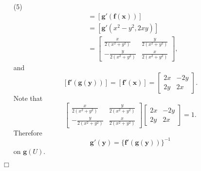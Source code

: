 \documentclass{article}
\begin{document}
\begin{enumerate}
\item[(5)]
  \begin{align*}
    [\mathbf{g}'(\mathbf{y})]
    &= [\mathbf{g}'(\mathbf{f}(\mathbf{x}))] \\
    &= [\mathbf{g}'(x^2-y^2, 2xy)] \\
    &=
    \begin{bmatrix}
       \frac{x}{2(x^2+y^2)} & \frac{y}{2(x^2+y^2)} \\
      -\frac{y}{2(x^2+y^2)} & \frac{x}{2(x^2+y^2)}
    \end{bmatrix},
  \end{align*}
  and
  \[
    [\mathbf{f}'(\mathbf{g}(\mathbf{y}))]
    = [\mathbf{f}'(\mathbf{x})]
    =
    \begin{bmatrix}
      2x & -2y \\
      2y &  2x
    \end{bmatrix}.
  \]
  Note that
  \[
    \begin{bmatrix}
       \frac{x}{2(x^2+y^2)} & \frac{y}{2(x^2+y^2)} \\
      -\frac{y}{2(x^2+y^2)} & \frac{x}{2(x^2+y^2)}
    \end{bmatrix}
    \begin{bmatrix}
      2x & -2y \\
      2y &  2x
    \end{bmatrix}
    = 1.
  \]
  Therefore
  \[
    \mathbf{g}'(\mathbf{y})
    = \{ \mathbf{f}'(\mathbf{g}(\mathbf{y})) \}^{-1}
  \]
  on $\mathbf{g}(U)$.
\end{enumerate}
$\Box$ \\
\end{document}
